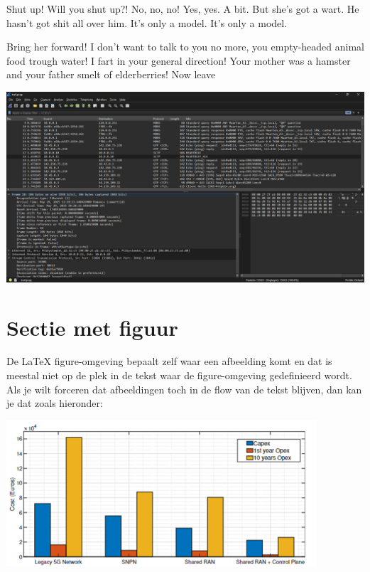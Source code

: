 \documentclass[a0,portrait]{hogent-poster}
\begin{document}
\begin{multicols}{2}
Shut up! Will you shut up?! No, no, no! Yes, yes. A bit. But she's got a wart. He hasn't got shit all over him. It's only a model. It's only a model.

Bring her forward! I don't want to talk to you no more, you empty-headed animal food trough water! I fart in your general direction! Your mother was a hamster and your father smelt of elderberries! Now leave 

\begin{center}
  \captionsetup{type=figure}
  \includegraphics[width=1.0\linewidth]{./graphics/POC-wireshark.png}
\end{center}


\section{Sectie met figuur}

De {\LaTeX} figure-omgeving bepaalt zelf waar een afbeelding komt en dat is meestal niet op de plek in de tekst waar de figure-omgeving gedefinieerd wordt. Als je wilt forceren dat afbeeldingen toch in de flow van de tekst blijven, dan kan je dat zoals hieronder:

\begin{center}
  \captionsetup{type=figure}
  \includegraphics[width=1.0\linewidth]{./graphics/capex-opex.png}
\end{center}


\end{multicols}
\end{document}
